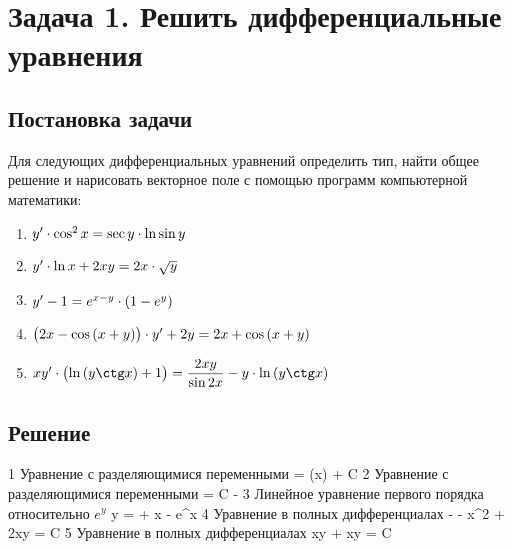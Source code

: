 

\section{Задача 1. Решить дифференциальные уравнения}
\subsection{Постановка задачи}
Для следующих дифференциальных уравнений определить тип, найти общее
решение и нарисовать векторное поле с помощью программ компьютерной математики:

\begin{enumerate}[label={}]
	\item $ {y}' \cdot \cos^{2}{x} = \sec{y} \cdot \ln{\sin{y}} $
	\item $ {y}' \cdot \ln{x} + 2xy = 2x \cdot \sqrt{y} $
	\item $ {y}' - 1 = e^{x-y} \cdot (1 - e^{y}) $    
	\item $ \mathopen{}\left( {2x - \cos{(x + y)}}_{{}_{}}\,\negthickspace\right)\mathclose{} \cdot {y}' + 2y = 2{x} + \cos{(x + y)} $
	\item $ \equationFifth $
\end{enumerate}

\newpage

\subsection{Решение}
\begin{enumerate}
	\taskOneSolutionItem
		{1}
		{\equationFirst}
		{Уравнение с разделяющимися переменными}
		{ = \tan(x) + {C}}
	\taskOneSolutionItem
		{2}
		{\equationSecond}
		{Уравнение с разделяющимися переменными}
		{ = C - }
	\taskOneSolutionItem
		{3}
		{\equationThird}
		{Линейное уравнение первого порядка относительно $ e^y $}
		{y =  + {x} - e^{x}}
	\taskOneSolutionItem
		{4}
		{\equationFourth}
		{Уравнение в полных дифференциалах}
		{- - {x}^2 + 2xy = C}
	\taskOneSolutionItem
		{5}
		{\equationFifth}
		{Уравнение в полных дифференциалах}
		{xy + xy = C}
\end{enumerate}
